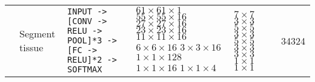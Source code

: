 \begin{landscape}
\begin{longtable}{cp{3.4cm}p{7cm}p{2.7cm}p{1.3cm}c}
	\cite{Dubrovina2015}& Segment tissue & \texttt{INPUT -> [CONV -> RELU -> POOL]*3 -> [FC -> RELU]*2 -> SOFTMAX} & $61\times 61 \times 1$ \newline $55 \times 55 \times 16$\newline $27\times 27 \times 16$\newline $23 \times 23 \times 16$ \newline $11 \times 11 \times 16$ \newline $6 \times 6 \times 16$ \newline $3 \times 3 \times 16$ \newline $1 \times 1 \times 128$ \newline $1 \times 1 \times 16$ \newline $1 \times 1 \times 4$ & $7 \times 7$ \newline $3 \times 3$ \newline $5 \times 5$ \newline $3 \times 3$ \newline $5 \times 5$ \newline $3 \times 3$ \newline $3 \times 3$ \newline $1 \times 1$ \newline $1 \times 1$ & 34324 \\
\end{longtable}
\end{landscape}


\begin{comment} 
Groups working on convnets for breast cancer:
Georgetown University Medical Center: Shih-Chung Lo, Matthew Freedman, Huai Li
Michigan Medical Center: Heang-Ping Chan, Sahiner, Hadjiiski, Helvie, Gurcan, Wei j and Ge, J
University of chicago (MTANN): Suzuki Kenji (not quite convnets)

Other deep learning applications:
Cruz-Roa mitosis detection in breast cancer histology images,
Ciresan similar

CAD review:
Tang2009
2013 breast cancer diagnosis a review or other good review.
Work at Tec.
\end{comment}


